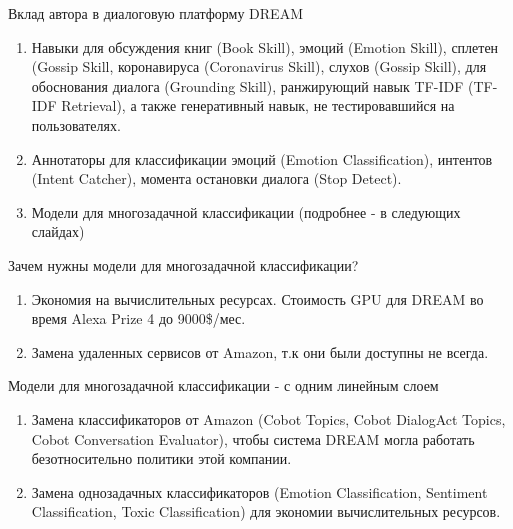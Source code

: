 \begin{frame}{Вклад автора в диалоговую платформу DREAM}
\begin{enumerate}
 \item Навыки для обсуждения книг (Book Skill), эмоций (Emotion Skill), сплетен (Gossip Skill, коронавируса (Coronavirus Skill), слухов (Gossip Skill), для обоснования диалога (Grounding Skill), ранжирующий навык TF-IDF (TF-IDF Retrieval), а также генеративный навык, не тестировавшийся на пользователях.
 \item Аннотаторы для классификации эмоций (Emotion Classification), интентов (Intent Catcher), момента остановки диалога (Stop Detect).
 \item Модели для многозадачной классификации (подробнее - в следующих слайдах)
\end{enumerate}
\end{frame}
\begin{frame}{Зачем нужны модели для многозадачной классификации?}
\begin{enumerate}
\item Экономия на вычислительных ресурсах. Стоимость GPU для DREAM во время Alexa Prize 4 до 9000\$/мес.
\item Замена удаленных сервисов от Amazon, т.к они были доступны не всегда.
\end{enumerate}
\end{frame}
\begin{frame}{Модели для многозадачной классификации - с одним линейным слоем}
\begin{enumerate}
\item Замена классификаторов от Amazon (Cobot Topics, Cobot DialogAct Topics, Cobot Conversation Evaluator), чтобы система DREAM могла работать безотносительно политики этой компании.
\item Замена однозадачных классификаторов (Emotion Classification, Sentiment Classification, Toxic Classification) для экономии вычислительных ресурсов.
\end{enumerate}
\end{frame}
